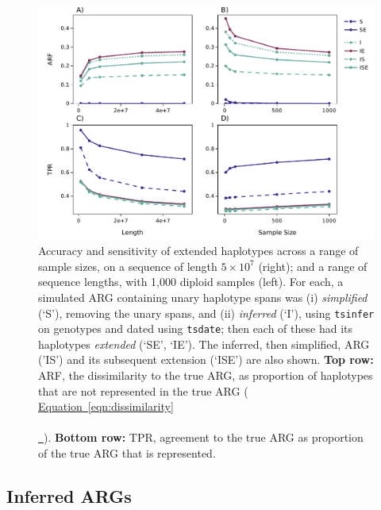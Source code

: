 \documentclass[10pt,twoside,lineno]{gsajnl}
\newcommand{\tsinfer}{\texttt{tsinfer}}
\newcommand{\tsdate}{\texttt{tsdate}}
\newcommand*{\eqnref}[2][]{%
	\hyperref[{#2}]{%
		Equation~\ref*{#2}%
		\ifx\\#1\\%
		\else
		\,#1%
		\fi
	}%
}
\begin{document}
\begin{figure}[!hbt]
	\begin{center}
        \includegraphics[width=\textwidth]{figures/figure6-ARF-TPR-plt3.pdf}
	\end{center}
    \caption{
        Accuracy and sensitivity of extended haplotypes
        across a range of sample sizes, on a sequence of length $5\times10^7$ (right);
        and a range of sequence lengths, with 1,000 diploid samples (left).
        For each, a simulated ARG containing unary haplotype spans
        was (i) \emph{simplified} (`S'), removing the unary spans,
        and (ii) \emph{inferred} (`I'), using \tsinfer{} on genotypes
        and dated using \tsdate{};
        then each of these had its haplotypes \emph{extended} (`SE', `IE').
        The inferred, then simplified, ARG ('IS') and its subsequent extension (`ISE') are also shown.
        \textbf{Top row:} ARF, the dissimilarity to the true ARG,
        as proportion of haplotypes that are not represented in the true ARG
        (\eqnref{eqn:dissimilarity}).
        \textbf{Bottom row:} TPR, agreement to the true ARG
        as proportion of the true ARG that is represented.
        }     
    \label{fig:dissimilarity}
\end{figure}


\subsection{Inferred ARGs}
\end{document}
